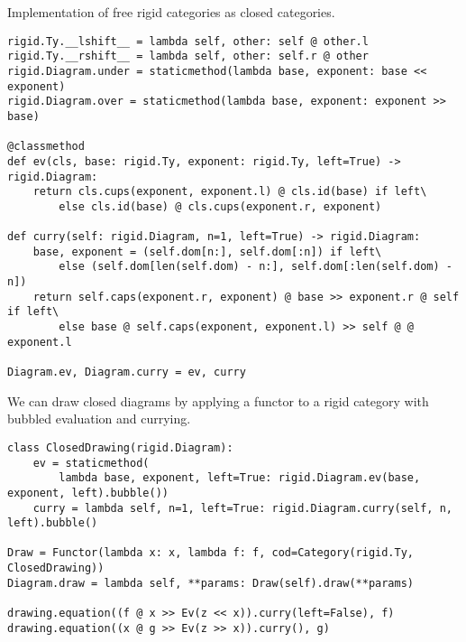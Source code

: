 \begin{python}
{\normalfont Implementation of free rigid categories as closed categories.}

\begin{verbatim}
rigid.Ty.__lshift__ = lambda self, other: self @ other.l
rigid.Ty.__rshift__ = lambda self, other: self.r @ other
rigid.Diagram.under = staticmethod(lambda base, exponent: base << exponent)
rigid.Diagram.over = staticmethod(lambda base, exponent: exponent >> base)

@classmethod
def ev(cls, base: rigid.Ty, exponent: rigid.Ty, left=True) -> rigid.Diagram:
    return cls.cups(exponent, exponent.l) @ cls.id(base) if left\
        else cls.id(base) @ cls.cups(exponent.r, exponent)

def curry(self: rigid.Diagram, n=1, left=True) -> rigid.Diagram:
    base, exponent = (self.dom[n:], self.dom[:n]) if left\
        else (self.dom[len(self.dom) - n:], self.dom[:len(self.dom) - n])
    return self.caps(exponent.r, exponent) @ base >> exponent.r @ self if left\
        else base @ self.caps(exponent, exponent.l) >> self @ @ exponent.l

Diagram.ev, Diagram.curry = ev, curry
\end{verbatim}
\end{python}

\begin{example}
We can draw closed diagrams by applying a functor to a rigid category with bubbled evaluation and currying.

\begin{verbatim}
class ClosedDrawing(rigid.Diagram):
    ev = staticmethod(
        lambda base, exponent, left=True: rigid.Diagram.ev(base, exponent, left).bubble())
    curry = lambda self, n=1, left=True: rigid.Diagram.curry(self, n, left).bubble()

Draw = Functor(lambda x: x, lambda f: f, cod=Category(rigid.Ty, ClosedDrawing))
Diagram.draw = lambda self, **params: Draw(self).draw(**params)

drawing.equation((f @ x >> Ev(z << x)).curry(left=False), f)
drawing.equation((x @ g >> Ev(z >> x)).curry(), g)
\end{verbatim}

\begin{center}
\hfill
{}
\end{center}
\end{example}
